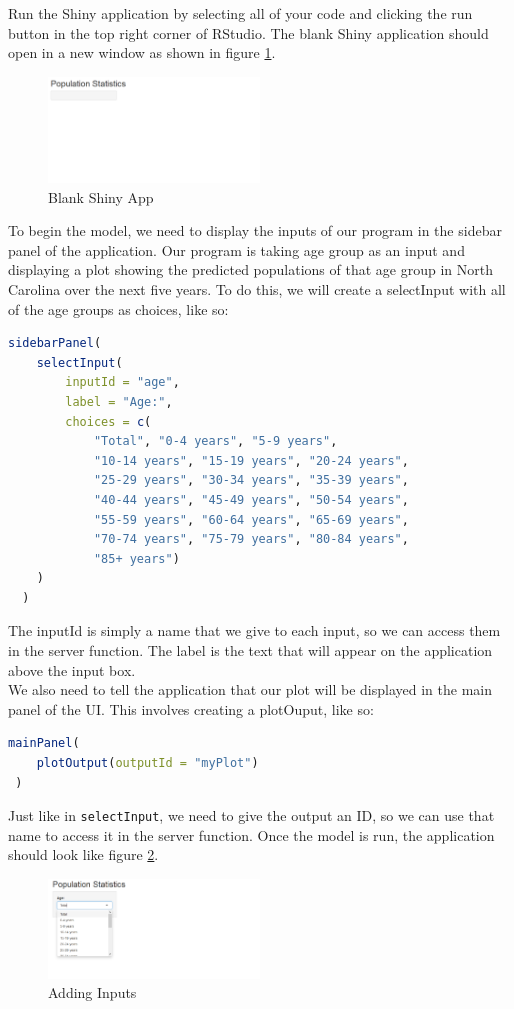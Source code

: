 Run the Shiny application by selecting all of your code and clicking the run button in the top right corner of RStudio.
The blank Shiny application should open in a new window as shown in figure \ref{fig:blank}.
\begin{figure}[h]
   \centering
   \includegraphics[width=0.5\textwidth]{pictures/shiny/blank.PNG} 
   \caption{Blank Shiny App}
   \label{fig:blank}
\end{figure}
To begin the model, we need to display the inputs of our program in the sidebar panel of the application. Our program is taking age group as an input and displaying a plot showing the predicted populations of that age group in North Carolina over the next five years. To do this, we will create a selectInput with all of the age groups as choices, like so:
\begin{lstlisting}[language = R]
sidebarPanel(
    selectInput(
        inputId = "age", 
        label = "Age:", 
        choices = c(
            "Total", "0-4 years", "5-9 years", 
            "10-14 years", "15-19 years", "20-24 years", 
            "25-29 years", "30-34 years", "35-39 years", 
            "40-44 years", "45-49 years", "50-54 years", 
            "55-59 years", "60-64 years", "65-69 years", 
            "70-74 years", "75-79 years", "80-84 years", 
            "85+ years")
    )
  )
\end{lstlisting}
The inputId is simply a name that we give to each input, so we can access them in the server function. The label is the text that will appear on the application above the input box. \\
We also need to tell the application that our plot will be displayed in the main panel of the UI. This involves creating a plotOuput, like so: 
\begin{lstlisting}[language = R]
 mainPanel(
    plotOutput(outputId = "myPlot")
 )
\end{lstlisting}
Just like in \texttt{selectInput}, we need to give the output an ID, so we can use that name to access it in the server function.
Once the model is run, the application should look like figure \ref{fig:drop}. 
\begin{figure}[h]
   \centering
   \includegraphics[width=0.5\textwidth]{pictures/shiny/dropdown.PNG} 
   \caption{Adding Inputs}
   \label{fig:drop}
\end{figure}
